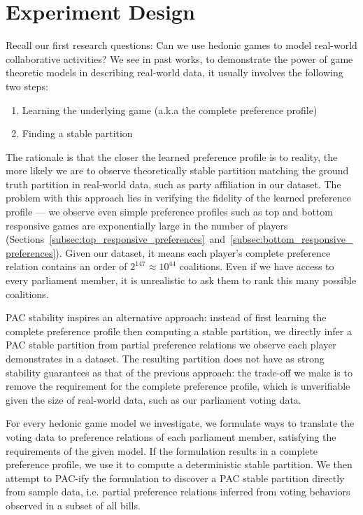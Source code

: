 \section{Experiment Design}

Recall our first research questions: Can we use hedonic games to model
real-world collaborative activities?
We see in past works, to demonstrate the power of game theoretic models
in describing real-world data, it usually involves the following two steps:

\begin{enumerate}
  \item Learning the underlying game (a.k.a the complete preference profile)
  \item Finding a stable partition
\end{enumerate}

The rationale is that the closer the learned preference profile is to reality,
the more likely we are to observe theoretically stable partition matching
the ground truth partition in real-world data, such as party affiliation in
our dataset.
The problem with this approach lies in verifying the fidelity of the learned
preference profile --- we observe even simple preference profiles such as top
and bottom responsive games are exponentially large in the number of players
(Sections~\ref{subsec:top_responsive_preferences}~and~\ref{subsec:bottom_responsive_preferences}).
Given our dataset, it means each player's complete preference relation contains
an order of $2^147 \approx 10^{44}$ coalitions.
Even if we have access to every parliament member, it is unrealistic to ask them
to rank this many possible coalitions.

PAC stability inspires an alternative approach: instead of first learning the
complete preference profile then computing a stable partition, we directly
infer a PAC stable partition from partial preference relations we observe
each player demonstrates in a dataset.
The resulting partition does not have as strong stability guarantees as that
of the previous approach: the trade-off we make is to remove the requirement for
the complete preference profile, which is unverifiable given the size of
real-world data, such as our parliament voting data.

For every hedonic game model we investigate, we formulate ways to translate the
voting data to preference relations of each parliament member, satisfying the
requirements of the given model.
If the formulation results in a complete preference profile, we use it to
compute a deterministic stable partition.
We then attempt to PAC-ify the formulation to discover a PAC stable partition
directly from sample data, i.e. partial preference relations inferred from
voting behaviors observed in a subset of all bills.

